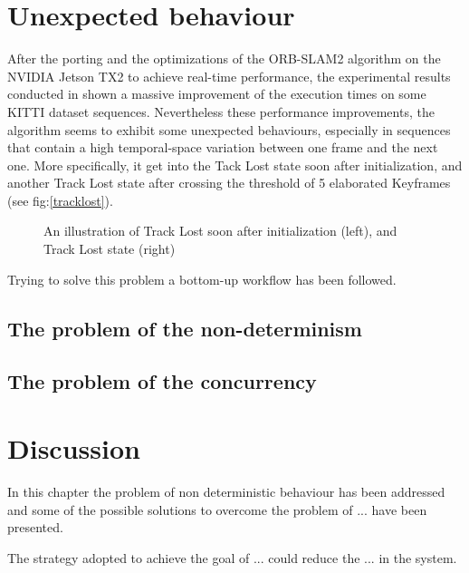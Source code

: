 

\section{Unexpected behaviour}
After the porting and the optimizations of the ORB-SLAM2 algorithm on the NVIDIA Jetson TX2 to achieve real-time performance, the experimental results conducted in \cite{iros2019} shown a massive improvement of the execution times on some KITTI dataset sequences.
Nevertheless these performance improvements, the algorithm seems to exhibit some unexpected behaviours, especially in sequences that contain a high temporal-space variation between one frame and the next one. More specifically, it get into the Tack Lost state soon after initialization, and another Track Lost state after crossing the threshold of 5 elaborated Keyframes (see fig:\ref{tracklost}).


\begin{figure}
	\centering
	\caption{An illustration of Track Lost soon after initialization (left), and Track Lost state (right)}
	\label{fig:tracklost}
\end{figure}

Trying to solve this problem a bottom-up workflow has been followed. %







\subsection{The problem of the non-determinism} %


\subsection{The problem of the concurrency} %




\section{Discussion}
In this chapter the problem of non deterministic behaviour has been addressed and some of the possible solutions to overcome the problem of ...  have been presented.

The strategy adopted to achieve the goal of ... could reduce the ... in the system.


\clearpage
\thispagestyle{empty}